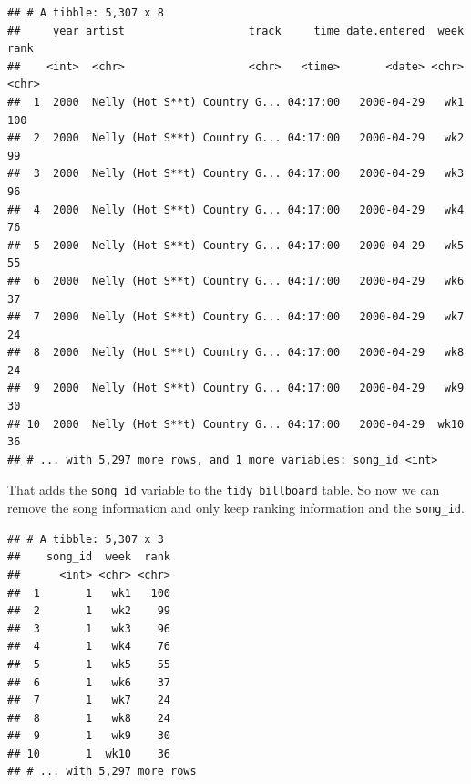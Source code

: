 \documentclass[]{book}
\newenvironment{Shaded}{\begin{snugshade}}{\end{snugshade}}
\newcommand{\KeywordTok}[1]{\textcolor[rgb]{0.13,0.29,0.53}{\textbf{#1}}}
\newcommand{\StringTok}[1]{\textcolor[rgb]{0.31,0.60,0.02}{#1}}
\newcommand{\OperatorTok}[1]{\textcolor[rgb]{0.81,0.36,0.00}{\textbf{#1}}}
\newcommand{\NormalTok}[1]{#1}
\theoremstyle{definition}
\theoremstyle{definition}
\theoremstyle{remark}
\begin{document}
\begin{verbatim}
## # A tibble: 5,307 x 8
##     year artist                   track     time date.entered  week  rank
##    <int>  <chr>                   <chr>   <time>       <date> <chr> <chr>
##  1  2000  Nelly (Hot S**t) Country G... 04:17:00   2000-04-29   wk1   100
##  2  2000  Nelly (Hot S**t) Country G... 04:17:00   2000-04-29   wk2    99
##  3  2000  Nelly (Hot S**t) Country G... 04:17:00   2000-04-29   wk3    96
##  4  2000  Nelly (Hot S**t) Country G... 04:17:00   2000-04-29   wk4    76
##  5  2000  Nelly (Hot S**t) Country G... 04:17:00   2000-04-29   wk5    55
##  6  2000  Nelly (Hot S**t) Country G... 04:17:00   2000-04-29   wk6    37
##  7  2000  Nelly (Hot S**t) Country G... 04:17:00   2000-04-29   wk7    24
##  8  2000  Nelly (Hot S**t) Country G... 04:17:00   2000-04-29   wk8    24
##  9  2000  Nelly (Hot S**t) Country G... 04:17:00   2000-04-29   wk9    30
## 10  2000  Nelly (Hot S**t) Country G... 04:17:00   2000-04-29  wk10    36
## # ... with 5,297 more rows, and 1 more variables: song_id <int>
\end{verbatim}

That adds the \texttt{song\_id} variable to the \texttt{tidy\_billboard}
table. So now we can remove the song information and only keep ranking
information and the \texttt{song\_id}.

\begin{Shaded}
\end{Shaded}

\begin{verbatim}
## # A tibble: 5,307 x 3
##    song_id  week  rank
##      <int> <chr> <chr>
##  1       1   wk1   100
##  2       1   wk2    99
##  3       1   wk3    96
##  4       1   wk4    76
##  5       1   wk5    55
##  6       1   wk6    37
##  7       1   wk7    24
##  8       1   wk8    24
##  9       1   wk9    30
## 10       1  wk10    36
## # ... with 5,297 more rows
\end{verbatim}
\end{document}
